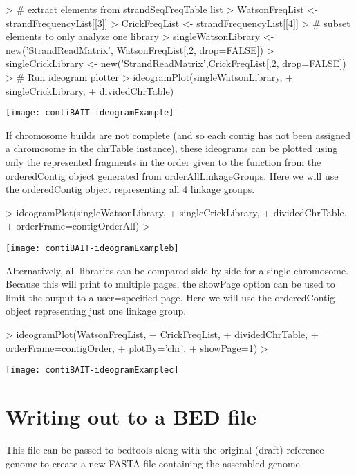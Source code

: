 \documentclass{article}
\begin{document}
\begin{Schunk}
\begin{Sinput}
> # extract elements from strandSeqFreqTable list
> WatsonFreqList <- strandFrequencyList[[3]]
> CrickFreqList <- strandFrequencyList[[4]]
> # subset elements to only analyze one library
> singleWatsonLibrary <- new('StrandReadMatrix', WatsonFreqList[,2, drop=FALSE])
> singleCrickLibrary <- new('StrandReadMatrix',CrickFreqList[,2, drop=FALSE]) 
> # Run ideogram plotter
> ideogramPlot(singleWatsonLibrary,
+ singleCrickLibrary,
+ dividedChrTable)
\end{Sinput}
\end{Schunk}
\texttt{[image: contiBAIT-ideogramExample]}

If chromosome builds are not complete (and so each contig has not been assigned a chromosome in the chrTable instance), these ideograms can be plotted using only the represented fragments in the order given to the function from the orderedContig object generated from orderAllLinkageGroups.  Here we will use the orderedContig object representing all 4 linkage groups.

\begin{Schunk}
\begin{Sinput}
> ideogramPlot(singleWatsonLibrary,
+ singleCrickLibrary,
+ dividedChrTable,
+ orderFrame=contigOrderAll)
> 
\end{Sinput}
\end{Schunk}
\texttt{[image: contiBAIT-ideogramExampleb]}

Alternatively, all libraries can be compared side by side for a single chromosome. Because this will print to multiple pages, the showPage option can be used to limit the output to a user=specified page. Here we will use the orderedContig object representing just one linkage group.

\begin{Schunk}
\begin{Sinput}
> ideogramPlot(WatsonFreqList,
+ CrickFreqList,
+ dividedChrTable,
+ orderFrame=contigOrder,
+ plotBy='chr',
+ showPage=1)
> 
\end{Sinput}
\end{Schunk}
\texttt{[image: contiBAIT-ideogramExamplec]}


\section{Writing out to a BED file}
This file can be passed to bedtools along with the original (draft) reference genome to create a new FASTA file containing the assembled genome.
\end{document}
